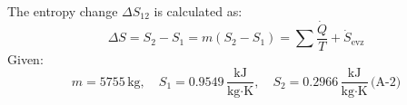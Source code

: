 The entropy change \( \Delta S_{12} \) is calculated as:  
\[
\Delta S = S_2 - S_1 = m(S_2 - S_1) = \sum \frac{\dot{Q}}{T} + \dot{S}_{\text{evz}}
\]  
Given:  
\[
m = 5755 \, \text{kg}, \quad S_1 = 0.9549 \, \frac{\text{kJ}}{\text{kg·K}}, \quad S_2 = 0.2966 \, \frac{\text{kJ}}{\text{kg·K}} \, \text{(A-2)}
\]